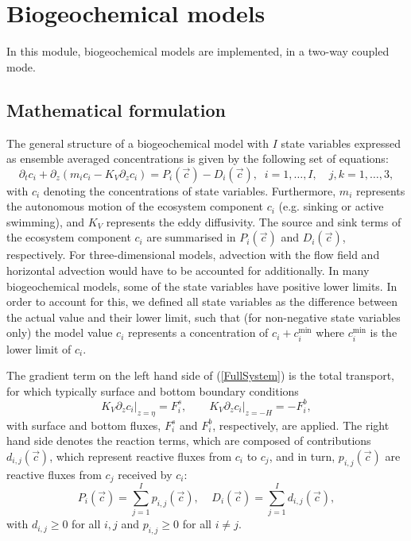 \section{Biogeochemical models \label{sec:bio-intro}}


In this module, biogeochemical models are implemented,
in a two-way coupled mode.

\subsection{Mathematical formulation}\label{sec:bio-math}

The general structure of a biogeochemical model with
$I$ state variables expressed as ensemble averaged
concentrations is given by the
following set of equations:
\begin{equation}\label{FullSystem}
  \partial_t c_i + \partial_z
\left(m_i c_i - K_V \partial_z c_i\right)
=   P_i(\vec{c}) -D_i(\vec{c}), \;\; i = 1,\ldots,I, \quad j,k = 1,\ldots,3,
\end{equation}
with $c_i$ denoting the concentrations of state variables.
Furthermore, $m_i$ represents the autonomous motion of the ecosystem
component $c_i$ (e.g. sinking or active swimming),
and $K_V$ represents the eddy diffusivity.
The source and sink terms of the ecosystem component
$c_i$ are summarised in $P_i(\vec{c})$ and $D_i(\vec{c})$, respectively.
For three-dimensional models, advection with the flow field
and horizontal advection would have to be accounted for additionally.
In many biogeochemical models, some of the state variables have positive
lower limits. In order to account for this,
we defined all state variables as the difference between
the actual value and their lower limit, such that
(for non-negative state variables only)
the model value $c_i$ represents a concentration of
$c_i+c_i^{\min}$ where $c_i^{\min}$ is the lower limit of $c_i$.

The gradient term on the left hand side of (\ref{FullSystem})
is the total transport,
for which typically surface and bottom boundary conditions
\begin{equation}
K_V\partial_z c_i\big|_{z=\eta} = F^s_i,\qquad
K_V\partial_z c_i\big|_{z=-H} = -F^b_i,
\end{equation}
with surface and bottom fluxes, $F^s_i$ and $F^b_i$, respectively,
are applied.
The right hand side denotes the reaction terms,
which are composed of contributions
$d_{i,j}(\vec{c})$, which represent reactive fluxes from
$c_i$ to $c_j$, and in turn, $p_{i,j}(\vec{c})$ are reactive fluxes from
$c_j$ received by $c_i$:
\begin{equation}\label{eq:am:a}
P_i(\vec{c}) = \sum^I_{j=1} p_{i,j}(\vec{c}), \;\;\;\;
D_i(\vec{c}) = \sum^I_{j=1} d_{i,j}(\vec{c}),
\end{equation}
with $d_{i,j}\geq 0$ for all $i,j$ and $p_{i,j}\geq 0$
for all $i\not= j$.

